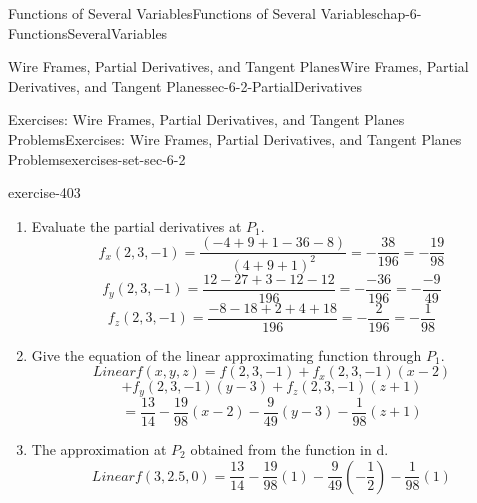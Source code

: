 \documentclass[oneside,10pt,]{book}
\numberwithin{equation}{section}
\begin{document}
\begin{chapterptx}{Functions of Several Variables}{}{Functions of Several Variables}{}{}{chap-6-FunctionsSeveralVariables}
\begin{sectionptx}{Wire Frames, Partial Derivatives, and Tangent Planes}{}{Wire Frames, Partial Derivatives, and Tangent Planes}{}{}{sec-6-2-PartialDerivatives}
\begin{exercises-subsection-numberless}{Exercises: Wire Frames, Partial Derivatives, and Tangent Planes Problems}{}{Exercises: Wire Frames, Partial Derivatives, and Tangent Planes Problems}{}{}{exercises-set-sec-6-2}
\begin{exercisegroup}
\begin{divisionexerciseeg}{9}{}{}{exercise-403}
\begin{enumerate}[label=(\alph*)]
\begin{equation*}
=\frac{(3x^2+3y^2+3z^2 )-(2xy+6y^2-4yz)}{(x^2+y^2+z^2 )^2}  
\end{equation*}
%
\begin{equation*}
=\frac{3x^2-3y^2+3z^2-2xy+4yz}{(x^2+y^2+z^2 )^2}  
\end{equation*}
%
\begin{equation*}
f_z  (x,y,z)=\frac{(-2)(x^2+y^2+z^2 )-(x+3y-2z)(2z)}{(x^2+y^2+z^2 )^2}
\end{equation*}
%
\begin{equation*}
=\frac{(-2x^2-2y^2-2z^2 )-(2xz+6yz-4z^2 )}{(x^2+y^2+z^2 )^2}  
\end{equation*}
%
\begin{equation*}
=\frac{-2x^2-2y^2+2z^2-2xz-6yz}{(x^2+y^2+z^2 )^2}  
\end{equation*}
\item\hypertarget{li-644}{}\hypertarget{p-2308}{}%
Evaluate the partial derivatives at \(P_1\).%
%
\begin{equation*}
f_x (2,3,-1)=\frac{(-4+9+1-36-8)}{(4+9+1)^2} = -\frac{38}{196}= -\frac{19}{98}
\end{equation*}
%
\begin{equation*}
f_y (2,3,-1) =\frac{12-27+3-12-12}{196} =-\frac{-36}{196} =-\frac{-9}{49}
\end{equation*}
%
\begin{equation*}
f_z (2,3,-1)=\frac{-8-18+2+4+18}{196}= -\frac{2}{196}=-\frac{1}{98}
\end{equation*}
\item\hypertarget{li-645}{}\hypertarget{p-2309}{}%
Give the equation of the linear approximating function through \(P_1\).%
%
\begin{equation*}
Linear f(x,y,z) 
= f(2,3,-1)+f_x  (2,3,-1)  (x-2)
\end{equation*}
%
\begin{equation*}
+f_y  (2,3,-1)(y-3)+f_z  (2,3,-1)(z+1)
\end{equation*}
%
\begin{equation*}
=  \frac{13}{14}-\frac{19}{98}  (x-2)-\frac{9}{49} (y-3)-\frac{1}{98}(z+1)
\end{equation*}
\item\hypertarget{li-646}{}\hypertarget{p-2310}{}%
The approximation at \(P_2\) obtained from the function in d.%
%
\begin{equation*}
Linear f(3,2.5,0)=  \frac{13}{14}-\frac{19}{98}  (1)-\frac{9}{49} \left(-\frac{1}{2}\right)-\frac{1}{98} (1)
\end{equation*}
%

\end{enumerate}
\end{divisionexerciseeg}
\end{exercisegroup}
\end{exercises-subsection-numberless}
\end{sectionptx}
\end{chapterptx}
\end{document}
